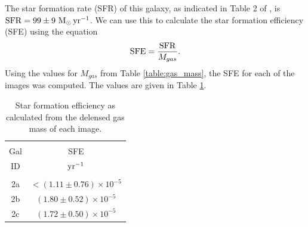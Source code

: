 \documentclass[11pt]{article}
\begin{document}
The star formation rate (SFR) of this galaxy, as indicated in Table 2 of \cite{MacKenzie2014}, is ${\rm SFR}=99\pm9~{\rm M_\odot\,yr^{-1}}$. We can use this to calculate the star formation efficiency (SFE) using the equation
\begin{align}
	{\rm SFE} = \frac{\rm SFR}{M_{gas}}.
\end{align}
Using the values for $M_{gas}$ from Table \ref{table:gas_mass}, the SFE for each of the images was computed. The values are given in Table \ref{table:sfe}.

\begin{table}[!htbp]
\centering
\begin{tabular}{cc}
\hline \\[-0.25cm]
Gal & SFE \\
ID  & $\rm{yr^{-1}}$ \\[0.1cm]
\hline \\[-0.25cm]
2a & $<(1.11 \pm 0.76)\times 10^{-5}$ \\
2b & $(1.80 \pm 0.52)\times 10^{-5}$  \\
2c & $(1.72 \pm 0.50)\times 10^{-5}$  \\
\hline
\end{tabular}
\caption{Star formation efficiency as calculated from the delensed gas mass of each image.}
\label{table:sfe}
\end{table}

\newpage
\nocite{*}

\end{document}
